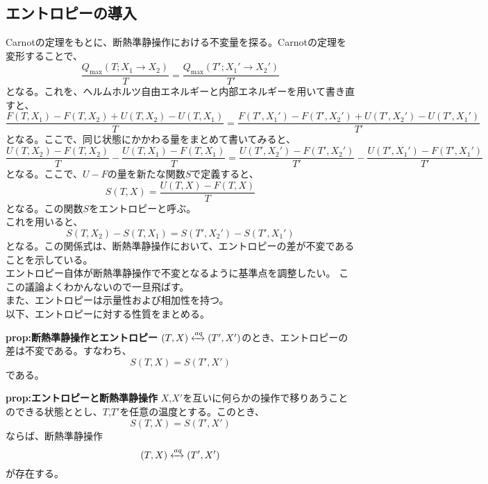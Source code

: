 \documentclass[a4paper,11pt]{jsarticle}
\begin{document}
\subsection{エントロピーの導入}
Carnotの定理をもとに、断熱準静操作における不変量を探る。Carnotの定理を変形することで、
\begin{equation}
    \frac{Q_{\text{max}}(T;X_1\rightarrow X_2)}{T} = \frac{Q_{\text{max}}(T';X_1'\rightarrow X_2')}{T'}
\end{equation}
となる。これを、ヘルムホルツ自由エネルギーと内部エネルギーを用いて書き直すと、
\begin{equation}
    \frac{F(T,X_1)-F(T,X_2)+U(T,X_2)-U(T,X_1)}{T} = \frac{F(T',X_1')-F(T',X_2')+U(T',X_2')-U(T',X_1')}{T'}
\end{equation}
となる。ここで、同じ状態にかかわる量をまとめて書いてみると、
\begin{equation}
    \frac{U(T,X_2)-F(T,X_2)}{T} - \frac{U(T,X_1)-F(T,X_1)}{T} = \frac{U(T',X_2')-F(T',X_2')}{T'} - \frac{U(T',X_1')-F(T',X_1')}{T'}
\end{equation}
となる。ここで、$U-F$の量を新たな関数$S$で定義すると、
\begin{equation}
    S(T,X) = \frac{U(T,X)-F(T,X)}{T}
\end{equation}
となる。この関数$S$をエントロピーと呼ぶ。\\
これを用いると、
\begin{equation}
    S(T,X_2)-S(T,X_1) = S(T',X_2')-S(T',X_1')
\end{equation}
となる。この関係式は、断熱準静操作において、エントロピーの差が不変であることを示している。\\
エントロピー自体が断熱準静操作で不変となるように基準点を調整したい。
ここの議論よくわかんないので一旦飛ばす。\\

また、エントロピーは示量性および相加性を持つ。\\
以下、エントロピーに対する性質をまとめる。\\
\begin{itembox}[l]{\textbf{prop:断熱準静操作とエントロピー}}
    $(T,X) \xleftrightarrow{aq} (T',X')$のとき、エントロピーの差は不変である。すなわち、
    \begin{equation}
        S(T,X) = S(T',X')
    \end{equation}
    である。
\end{itembox}

\begin{itembox}[l]{\textbf{prop:エントロピーと断熱準静操作}}
    $X$,$X'$を互いに何らかの操作で移りあうことのできる状態ととし、$T$,$T'$を任意の温度とする。このとき、
    \begin{equation}
        S(T,X) = S(T',X')
    \end{equation}
    ならば、断熱準静操作
    \begin{equation}
        (T,X) \xleftrightarrow{aq} (T',X')
    \end{equation}
    が存在する。
\end{itembox}
\end{document}
